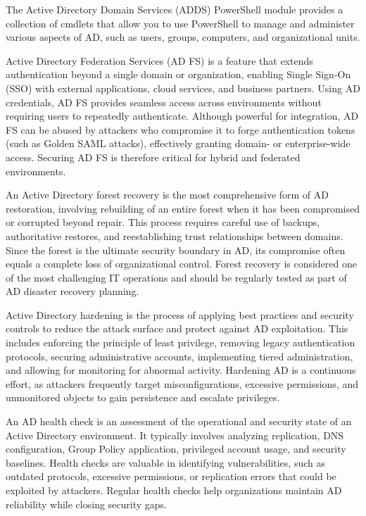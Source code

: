 The Active Directory Domain Services (ADDS) PowerShell module provides a collection of cmdlets that allow you to use PowerShell to manage and administer various aspects of AD, such as users, groups, computers, and organizational units.

 Active Directory Federation Services (AD FS) is a feature that extends authentication beyond a single domain or organization, enabling Single Sign-On (SSO) with external applications, cloud services, and business partners. Using AD credentials, AD FS provides seamless access across environments without requiring users to repeatedly authenticate. Although powerful for integration, AD FS can be abused by attackers who compromise it to forge authentication tokens (such as Golden SAML attacks), effectively granting domain- or enterprise-wide access. Securing AD FS is therefore critical for hybrid and federated environments.

 An Active Directory forest recovery is the most comprehensive form of AD restoration, involving rebuilding of an entire forest when it has been compromised or corrupted beyond repair. This process requires careful use of backups, authoritative restores, and reestablishing trust relationships between domains. Since the forest is the ultimate security boundary in AD, its compromise often equals a complete loss of organizational control. Forest recovery is considered one of the most challenging IT operations and should be regularly tested as part of AD disaster recovery planning.

 Active Directory hardening is the process of applying best practices and security controls to reduce the attack surface and protect against AD exploitation. This includes enforcing the principle of least privilege, removing legacy authentication protocols, securing administrative accounts, implementing tiered administration, and allowing for monitoring for abnormal activity. Hardening AD is a continuous effort, as attackers frequently target misconfigurations, excessive permissions, and unmonitored objects to gain persistence and escalate privileges.

 An AD health check is an assessment of the operational and security state of an Active Directory environment. It typically involves analyzing replication, DNS configuration, Group Policy application, privileged account usage, and security baselines. Health checks are valuable in identifying vulnerabilities, such as outdated protocols, excessive permissions, or replication errors that could be exploited by attackers. Regular health checks help organizations maintain AD reliability while closing security gaps.

